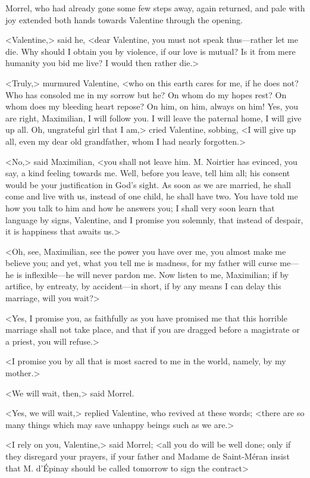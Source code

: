  Morrel, who had already gone some few steps away, again returned, and pale with joy extended both hands towards Valentine through the opening. 

 <Valentine,> said he, <dear Valentine, you must not speak thus—rather let me die. Why should I obtain you by violence, if our love is mutual? Is it from mere humanity you bid me live? I would then rather die.> 

 <Truly,> murmured Valentine, <who on this earth cares for me, if he does not? Who has consoled me in my sorrow but he? On whom do my hopes rest? On whom does my bleeding heart repose? On him, on him, always on him! Yes, you are right, Maximilian, I will follow you. I will leave the paternal home, I will give up all. Oh, ungrateful girl that I am,> cried Valentine, sobbing, <I will give up all, even my dear old grandfather, whom I had nearly forgotten.> 

 <No,> said Maximilian, <you shall not leave him. M. Noirtier has evinced, you say, a kind feeling towards me. Well, before you leave, tell him all; his consent would be your justification in God's sight. As soon as we are married, he shall come and live with us, instead of one child, he shall have two. You have told me how you talk to him and how he answers you; I shall very soon learn that language by signs, Valentine, and I promise you solemnly, that instead of despair, it is happiness that awaits us.> 

 <Oh, see, Maximilian, see the power you have over me, you almost make me believe you; and yet, what you tell me is madness, for my father will curse me—he is inflexible—he will never pardon me. Now listen to me, Maximilian; if by artifice, by entreaty, by accident—in short, if by any means I can delay this marriage, will you wait?> 

 <Yes, I promise you, as faithfully as you have promised me that this horrible marriage shall not take place, and that if you are dragged before a magistrate or a priest, you will refuse.> 

 <I promise you by all that is most sacred to me in the world, namely, by my mother.> 

 <We will wait, then,> said Morrel. 

 <Yes, we will wait,> replied Valentine, who revived at these words; <there are so many things which may save unhappy beings such as we are.> 

 <I rely on you, Valentine,> said Morrel; <all you do will be well done; only if they disregard your prayers, if your father and Madame de Saint-Méran insist that M. d'Épinay should be called tomorrow to sign the contract\longdash> 

